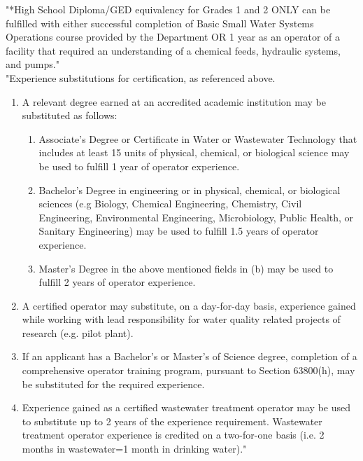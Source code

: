 \documentclass[10pt]{article}
\begin{document}
"*High School Diploma/GED equivalency for Grades 1 and 2 ONLY can be fulfilled with either successful completion of Basic Small Water Systems Operations course provided by the Department
OR 1 year as an operator of a facility that required an understanding of a chemical feeds, hydraulic systems, and pumps."\\			
"Experience substitutions for certification, as referenced above.
\begin{enumerate}
\item A relevant degree earned at an accredited academic institution may be substituted as follows:
\begin{enumerate}[label=\alph*)]
\item Associate’s Degree or Certificate in Water or Wastewater Technology that includes at least 15 units of physical, chemical, or biological science may be used to fulfill 1 year of operator experience.
\item Bachelor’s Degree in engineering or in physical, chemical, or biological sciences (e.g Biology, Chemical Engineering, Chemistry, Civil Engineering, Environmental Engineering, Microbiology, Public Health, or Sanitary Engineering) may be used to fulfill 1.5 years of operator experience.
\item Master’s Degree in the above mentioned fields in (b) may be used to fulfill 2 years of operator experience.
\end{enumerate}
\item A certified operator may substitute, on a day-for-day basis, experience gained while working with lead responsibility for water quality related projects of research (e.g. pilot plant).
\item If an applicant has a Bachelor’s or Master’s of Science degree, completion of a comprehensive operator training program, pursuant to Section 63800(h), may be substituted for the required experience.
\item Experience gained as a certified wastewater treatment operator may be used to substitute up to 2 years of the experience requirement. Wastewater treatment operator experience is credited on a two-for-one basis (i.e. 2 months in wastewater=1 month in drinking water)."			
\end{enumerate}
\end{document}
